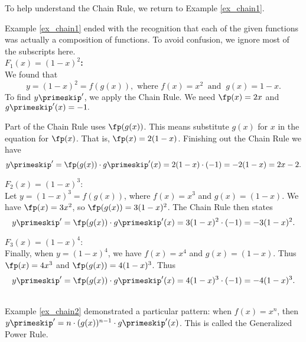  

To help  understand the Chain Rule, we return to Example \ref{ex_chain1}.\\

{Example \ref{ex_chain1} ended with the recognition that each of the given functions was actually a composition of functions. To avoid confusion, we ignore most of the subscripts here. \\ %

\noindent\textbf{$F_1(x) = (1-x)^2$:}\\

We found that 
\[
y=(1-x)^2 = f(g(x)), \text{ where } f(x) = x^2\ \text{ and }\ g(x) = 1-x.
\]
To find $y\primeskip'$, we apply the Chain Rule. We need $\fp(x)=2x$ and $g\primeskip'(x)=-1.$

Part of the Chain Rule uses $\fp(g(x))$. This means substitute $g(x)$ for $x$ in the equation for $\fp(x)$. That is, $\fp(x) = 2(1-x)$.  Finishing out the Chain Rule we have 
\[
y\primeskip' = \fp(g(x))\cdot g\primeskip'(x) = 2(1-x)\cdot (-1) = -2(1-x)= 2x-2.
\]

\noindent $F_2(x) = (1-x)^3$:\\

Let $y = (1-x)^3 = f(g(x))$, where $f(x) = x^3$ and $g(x) = (1-x)$. We have $\fp(x) = 3x^2$, so $\fp(g(x)) = 3(1-x)^2$. The Chain Rule then states 
\[
y\primeskip' = \fp(g(x))\cdot g\primeskip'(x) = 3(1-x)^2\cdot(-1) = -3(1-x)^2.
\]

\enlargethispage{2\baselineskip}%
\noindent $F_3(x) = (1-x)^4$:\\

Finally, when $y = (1-x)^4$, we have $f(x)= x^4$ and $g(x) = (1-x)$. Thus $\fp(x) = 4x^3$ and $\fp(g(x)) = 4(1-x)^3$. Thus 
\[
y\primeskip' = \fp(g(x))\cdot g\primeskip'(x) = 4(1-x)^3\cdot (-1) = -4(1-x)^3.
\]
\baselineskip
}\\

Example \ref{ex_chain2} demonstrated a particular pattern: when $f(x)=x^n$, then $y\primeskip' =n\cdot (g(x))^{n-1}\cdot g\primeskip'(x)$. This  is called the Generalized Power Rule.\\


